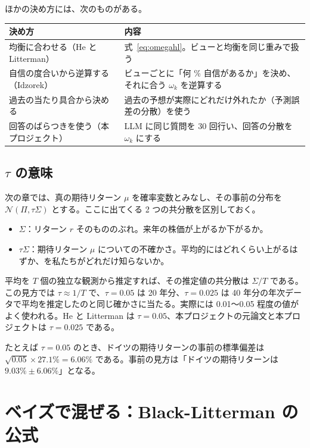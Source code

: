 \documentclass[xelatex,ja=standard,jafont=hiragino-pron,a4paper,11pt,openany]{bxjsreport}
\begin{document}
ほかの決め方には、次のものがある。

\begin{center}
\small
\begin{tabular}{p{4.0cm}p{9.2cm}}
\toprule
決め方 & 内容 \\
\midrule
均衡に合わせる（He と Litterman） & 式~\eqref{eq:omegahl}。ビューと均衡を同じ重みで扱う \\
自信の度合いから逆算する（Idzorek） & ビューごとに「何 \% 自信があるか」を決め、それに合う $\omega_k$ を逆算する \\
過去の当たり具合から決める & 過去の予想が実際にどれだけ外れたか（予測誤差の分散）を使う \\
回答のばらつきを使う（本プロジェクト） & LLM に同じ質問を 30 回行い、回答の分散を $\omega_k$ にする \\
\bottomrule
\end{tabular}
\end{center}

\section{$\tau$ の意味}

次の章では、真の期待リターン $\mu$ を確率変数とみなし、その事前の分布を $\mathcal{N}(\Pi, \tau\Sigma)$ とする。ここに出てくる 2 つの共分散を区別しておく。

\begin{itemize}
\item $\Sigma$：リターン $r$ そのもののぶれ。来年の株価が上がるか下がるか。
\item $\tau\Sigma$：期待リターン $\mu$ についての不確かさ。平均的にはどれくらい上がるはずか、を私たちがどれだけ知らないか。
\end{itemize}

平均を $T$ 個の独立な観測から推定すれば、その推定値の共分散は $\Sigma/T$ である。この見方では $\tau \approx 1/T$ で、$\tau = 0.05$ は 20 年分、$\tau = 0.025$ は 40 年分の年次データで平均を推定したのと同じ確かさに当たる。実際には 0.01〜0.05 程度の値がよく使われる。He と Litterman は $\tau = 0.05$、本プロジェクトの元論文と本プロジェクトは $\tau = 0.025$ である。

たとえば $\tau = 0.05$ のとき、ドイツの期待リターンの事前の標準偏差は $\sqrt{0.05} \times 27.1\% = 6.06\%$ である。事前の見方は「ドイツの期待リターンは $9.03\% \pm 6.06\%$」となる。

\chapter{ベイズで混ぜる：Black-Litterman の公式}\label{ch:bl}
\end{document}
